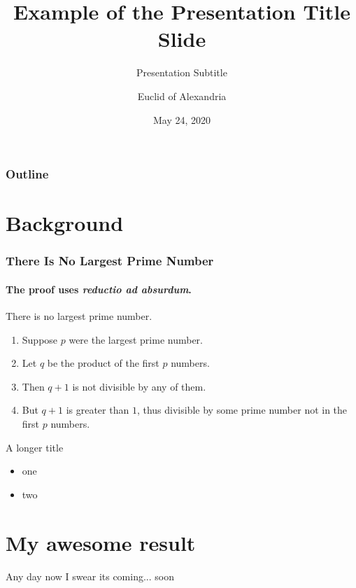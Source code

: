 \documentclass[aspectratio=169]{beamer}
\title{Example of the Presentation Title Slide}
\subtitle{Presentation Subtitle}
\date[ISPN ’80]{May 24, 2020}
\author[Euclid]{Euclid of Alexandria}
\begin{document}
\begin{frame}
\titlepage
\end{frame}

\begin{frame}
\frametitle{Outline}
\tableofcontents
\end{frame}

\section{Background}

\begin{frame} 
\frametitle{There Is No Largest Prime Number} 
\framesubtitle{The proof uses \textit{reductio ad absurdum}.} 
\begin{theorem}
There is no largest prime number. \end{theorem} 
\begin{enumerate} 
\item<1-| alert@1> Suppose $p$ were the largest prime number. 
\item<2-> Let $q$ be the product of the first $p$ numbers. 
\item<3-> Then $q+1$ is not divisible by any of them. 
\item<1-> But $q + 1$ is greater than $1$, thus divisible by some prime
number not in the first $p$ numbers.
\end{enumerate}
\end{frame}

\begin{frame}{A longer title}
\begin{itemize}
\item one
\item two
\end{itemize}
\end{frame}

\section{My awesome result}
\begin{frame}{Any day now}
	I swear its coming... soon
\end{frame}
\end{document}
